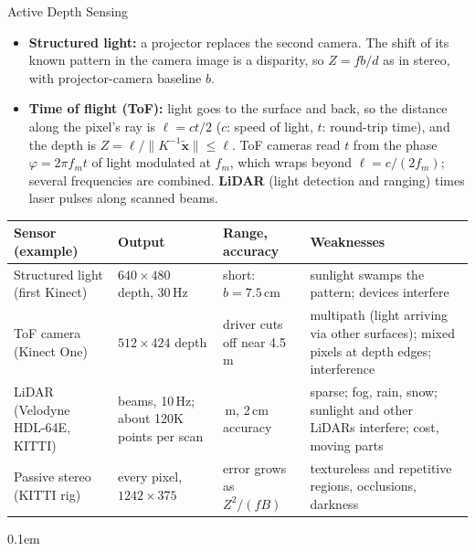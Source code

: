 \begin{frame}{Active Depth Sensing}
  \begin{itemize}\scriptsize\itemsep0.1em
    \item \textbf{Structured light:} a projector replaces the second camera. The shift of its known pattern in the camera image is a disparity, so $Z = fb/d$ as in stereo, with projector-camera baseline $b$.
    \item \textbf{Time of flight (ToF):} light goes to the surface and back, so the distance along the pixel's ray is $\ell = ct/2$ ($c$: speed of light, $t$: round-trip time), and the depth is $Z = \ell/\lVert K^{-1}\tilde{\mathbf{x}}\rVert \leq \ell$. ToF cameras read $t$ from the phase $\varphi = 2\pi f_m t$ of light modulated at $f_m$, which wraps beyond $\ell = c/(2f_m)$; several frequencies are combined. \textbf{LiDAR} (light detection and ranging) times laser pulses along scanned beams.
  \end{itemize}
  \vspace{0.1em}
  {\centering\scriptsize\setlength{\tabcolsep}{4pt}
  \begin{tabular}{>{\raggedright\arraybackslash}p{2.6cm} >{\raggedright\arraybackslash}p{2.7cm} >{\raggedright\arraybackslash}p{2.3cm} >{\raggedright\arraybackslash}p{5.2cm}}
    \toprule
    \textbf{Sensor (example)} & \textbf{Output} & \textbf{Range, accuracy} & \textbf{Weaknesses} \\
    \midrule
    Structured light (first Kinect) & $640{\times}480$ depth, 30\,Hz & short: $b = 7.5$\,cm & sunlight swamps the pattern; devices interfere \\
    \addlinespace[0.1em]
    ToF camera (Kinect One) & $512{\times}424$ depth & driver cuts off near 4.5\,m & multipath (light arriving via other surfaces); mixed pixels at depth edges; interference \\
    \addlinespace[0.1em]
    LiDAR (Velodyne HDL-64E, KITTI) & 64 beams, 10\,Hz; about 120K points per scan & 120\,m, 2\,cm accuracy & sparse; fog, rain, snow; sunlight and other LiDARs interfere; cost, moving parts \\
    \addlinespace[0.1em]
    Passive stereo (KITTI rig) & every pixel, $1242{\times}375$ & error grows as $Z^2/(fB)$ & textureless and repetitive regions, occlusions, darkness \\
    \bottomrule
  \end{tabular}\par}
  \vspace{0.1em}
  \begin{itemize}\scriptsize\itemsep0.1em

\end{itemize}
\end{frame}
